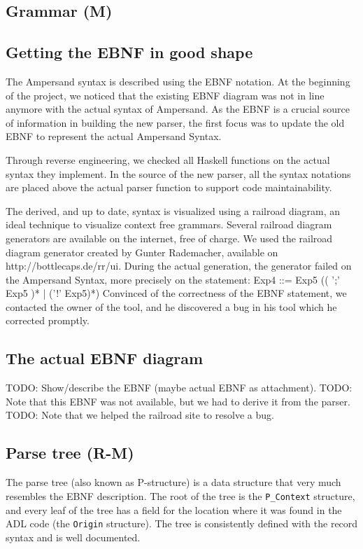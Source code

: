 \subsection{Grammar (M)}
\label{subsec:analysis-grammar}
%
%

\subsection{Getting the EBNF in good shape}
The Ampersand syntax is described using the EBNF notation. 
At the beginning of the project, we noticed that the existing EBNF diagram was not in line anymore with the actual syntax of Ampersand.
As the EBNF is a crucial source of information in building the new parser, the first focus was to update the old EBNF to represent the actual Ampersand Syntax.

Through reverse engineering, we checked all Haskell functions on the actual syntax they implement.
In the source of the new parser, all the syntax notations are placed above the actual parser function to support code maintainability.

The derived, and up to date, syntax is visualized using a railroad diagram, an ideal technique to visualize context free grammars.
Several railroad diagram generators are available on the internet, free of charge.
We used the railroad diagram generator created by Gunter Rademacher, available on http://bottlecaps.de/rr/ui.
During the actual generation, the generator failed on the Ampersand Syntax, more precisely on the statement: Exp4 ::= Exp5 (( ';' Exp5 )* | ('!' Exp5)*)
Convinced of the correctness of the EBNF statement, we contacted the owner of the tool, and he discovered a bug in his tool which he corrected promptly.

\subsection{The actual EBNF diagram}

TODO: Show/describe the EBNF (maybe actual EBNF as attachment).
TODO: Note that this EBNF was not available, but we had to derive it from the parser.
TODO: Note that we helped the railroad site to resolve a bug.

\subsection{Parse tree (R-M)}
\label{subsec:analysis-parse-tree}
The parse tree (also known as P-structure) is a data structure that very much resembles the EBNF description.
The root of the tree is the \texttt{P\_Context} structure, and every leaf of the tree has a field for the location where it was found in the ADL code (the \texttt{Origin} structure).
The tree is consistently defined with the record syntax and is well documented.

